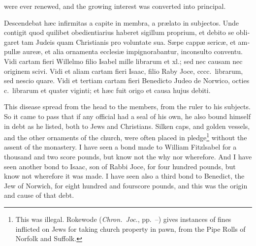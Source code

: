 \documentclass[10pt]{book}
\begin{document}
\begin{paracol}{2}
\end{paracol}

\vspace{-2\parskip}
\vspace{-3\lineskip}
were ever renewed, and the growing interest was converted into principal.\linebreak{}

\begin{paracol}{2}


\begin{otherlanguage}{latin}
Descendebat h\ae{}c infirmitas a capite in membra, a pr\ae{}lato in subjectos. Unde contigit quod quilibet obedientiarius haberet sigillum proprium, et debito se obligaret tam Judeis quam Christianis pro voluntate sua. S\ae{}pe capp\ae{} seric\ae{}, et ampull\ae{} aure\ae{}, et alia ornamenta ecclesi\ae{} impignorabantur, inconsulto conventu. Vidi cartam fieri Willelmo filio Isabel mille librarum et xl.; sed nec causam nec originem scivi. Vidi et aliam cartam fieri Isaac, filio Raby Joce, cccc.\ librarum, sed nescio quare. Vidi et tertiam cartam fieri Benedicto Judeo de Norwico, octies c.\ librarum et quater viginti; et h\ae{}c fuit origo et causa hujus debiti.
\end{otherlanguage}

\switchcolumn

This disease spread from the head to the members, from the ruler to his subjects. So it came to pass that if any official had a seal of his own, he also bound himself in debt as he listed, both to Jews and Christians. Silken caps, and golden vessels, and the other ornaments of the church, were often placed in pledge\footnote{This was illegal. Rokewode (\emph{Chron.\ Joc}., pp.\ --) gives instances of fines inflicted on Jews for taking church property in pawn, from the Pipe Rolls of Norfolk and Suffolk.} without the assent of the monastery. I have seen a bond made to William Fitzlsabel for a thousand and two score pounds, but know not the why nor wherefore. And I have seen another bond to Isaac, son of Rabbi Joce, for four hundred pounds, but know not wherefore it was made. I have seen also a third bond to Benedict, the Jew of Norwich, for eight hundred and fourscore pounds, and this was the origin and cause of that debt.

\switchcolumn*


\end{paracol}
\end{document}
